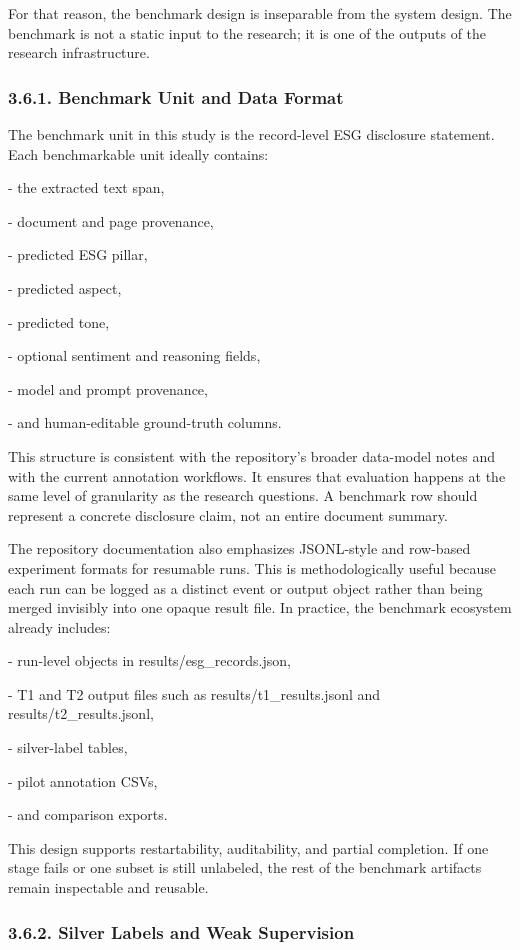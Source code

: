 \documentclass{article}
\begin{document}
For that reason, the benchmark design is inseparable from the system design. The benchmark is not a static input to the research; it is one of the outputs of the research infrastructure.
\subsubsection*{3.6.1. Benchmark Unit and Data Format}

The benchmark unit in this study is the record-level ESG disclosure statement. Each benchmarkable unit ideally contains:

- the extracted text span,

- document and page provenance,

- predicted ESG pillar,

- predicted aspect,

- predicted tone,

- optional sentiment and reasoning fields,

- model and prompt provenance,

- and human-editable ground-truth columns.

This structure is consistent with the repository’s broader data-model notes and with the current annotation workflows. It ensures that evaluation happens at the same level of granularity as the research questions. A benchmark row should represent a concrete disclosure claim, not an entire document summary.

The repository documentation also emphasizes JSONL-style and row-based experiment formats for resumable runs. This is methodologically useful because each run can be logged as a distinct event or output object rather than being merged invisibly into one opaque result file. In practice, the benchmark ecosystem already includes:

- run-level objects in results/esg\_records.json,

- T1 and T2 output files such as results/t1\_results.jsonl and results/t2\_results.jsonl,

- silver-label tables,

- pilot annotation CSVs,

- and comparison exports.

This design supports restartability, auditability, and partial completion. If one stage fails or one subset is still unlabeled, the rest of the benchmark artifacts remain inspectable and reusable.
\subsubsection*{ 3.6.2. Silver Labels and Weak Supervision}
\end{document}
